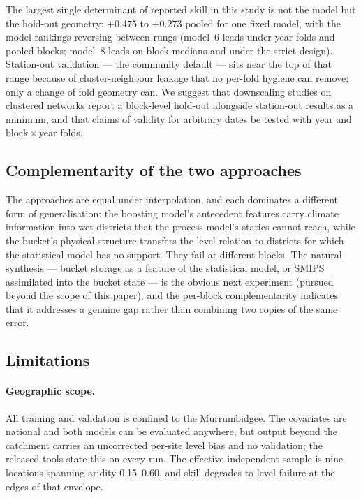 \documentclass[11pt,a4paper]{article}
\begin{document}
The largest single determinant of reported skill in this study is not the
model but the hold-out geometry: $+0.475$ to $+0.273$ pooled for one fixed
model, with the model rankings reversing between rungs (model~6 leads under
year folds and pooled blocks; model~8 leads on block-medians and under the
strict design). Station-out validation --- the community default --- sits near
the top of that range because of cluster-neighbour leakage that no per-fold
hygiene can remove; only a change of fold geometry can. We suggest that
downscaling studies on clustered networks report a block-level hold-out
alongside station-out results as a minimum, and that claims of validity for
arbitrary dates be tested with year and block\,$\times$\,year folds.

\subsection{Complementarity of the two approaches}\label{sec:tracks}

The approaches are equal under interpolation, and each dominates a different
form of generalisation: the boosting model's antecedent features carry climate
information into wet districts that the process model's statics cannot reach,
while the bucket's physical structure transfers the level relation to
districts for which the statistical model has no support. They fail at
different blocks. The natural synthesis --- bucket storage as a feature of the
statistical model, or SMIPS assimilated into the bucket state --- is the
obvious next experiment (pursued beyond the scope of this paper), and the
per-block complementarity indicates that it addresses a genuine gap rather
than combining two copies of the same error.

\subsection{Limitations}\label{sec:limitations}

\paragraph{Geographic scope.} All training and validation is confined to the
Murrumbidgee. The covariates are national and both models can be evaluated
anywhere, but output beyond the catchment carries an uncorrected per-site
level bias and no validation; the released tools state this on every run. The
effective independent sample is nine locations spanning aridity 0.15--0.60,
and skill degrades to level failure at the edges of that envelope.
\end{document}
